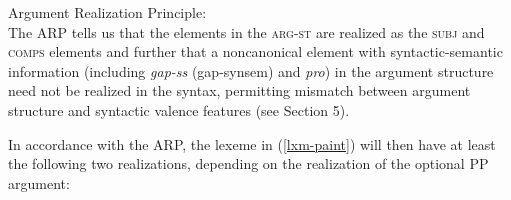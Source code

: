\ea
\label{arp}
Argument Realization Principle:\\
 \impl
{}
\z
The ARP tells us that the elements in the \textsc{arg-st} are realized as the \textsc{subj} and
\textsc{comps} elements and further that a noncanonical  element with syntactic-semantic information (including \textit{gap-ss} (gap-synsem) and \textit{pro}) in the argument structure need not be realized in the syntax, permitting mismatch between argument structure and syntactic valence features (see Section 5). 

In accordance with the ARP, the lexeme in (\ref{lxm-paint}) will then have at least the following two realizations, depending on the realization of the optional PP argument:

\ea
\label{paint2}
\z

